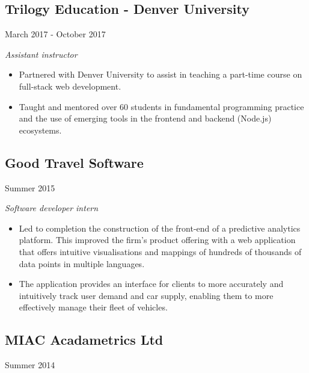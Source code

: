 \noindent\begin{minipage}[t]{0.55\textwidth}
\subsection*{Trilogy Education - Denver University}
\end{minipage}
\noindent\begin{minipage}[t]{0.45\textwidth}
  \flushright
  March 2017 - October 2017
\end{minipage}

\emph{Assistant instructor}

\begin{itemize}
\item Partnered with Denver University to assist in teaching a part-time
  course on full-stack web development.

\item Taught and mentored over 60 students in fundamental programming practice
  and the use of emerging tools in the frontend and backend (Node.js)
  ecosystems.
\end{itemize}

\noindent\begin{minipage}[t]{0.5\textwidth}
  \subsection*{Good Travel Software}
\end{minipage}
\noindent\begin{minipage}[t]{0.5\textwidth}
  \flushright
  Summer 2015
\end{minipage}

\emph{Software developer intern}

\begin{itemize}
\item Led to completion the construction of the front-end of a predictive
  analytics platform. This improved the firm's product offering with a web
  application that offers intuitive visualisations and mappings of hundreds of
  thousands of data points in multiple languages.

\item The application provides an interface for clients to more accurately and
  intuitively track user demand and car supply, enabling them to more
  effectively manage their fleet of vehicles.
\end{itemize}

\noindent\begin{minipage}[t]{0.5\textwidth}
  \subsection*{MIAC Acadametrics Ltd}
\end{minipage}
\noindent\begin{minipage}[t]{0.5\textwidth}
  \flushright
  Summer 2014
\end{minipage}

